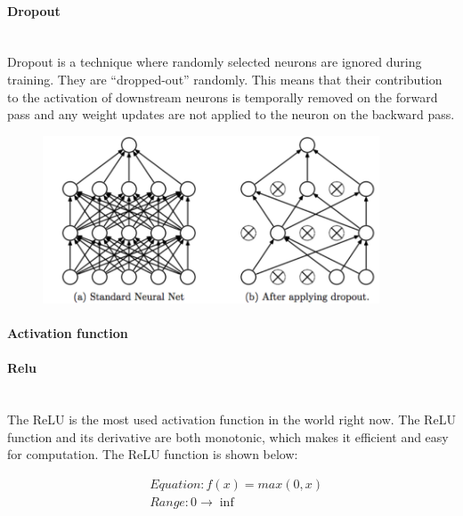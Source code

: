 \documentclass[runningheads]{llncs}
\begin{document}
\paragraph{\large\bf Dropout}\hspace*{\fill} \\
Dropout is a technique where randomly selected neurons are ignored during training. They are “dropped-out” randomly. This means that their contribution to the activation of downstream neurons is temporally removed on the forward pass and any weight updates are not applied to the neuron on the backward pass.\cite{cnn_project}

\begin{figure}[H]
    \centering
    \includegraphics[width=10cm]{Figures/dropout.png}
    \label{fig:dropout}
\end{figure}

\paragraph{\large\bf Activation function}\hspace*{\fill}
\paragraph{\bf Relu}\hspace*{\fill} \\
The ReLU is the most used activation function in the world right now. The ReLU function and its derivative are both monotonic, which makes it efficient and easy for computation. The ReLU function is shown below:

\begin{equation}
\begin{aligned}
    &Equation: f(x) = max(0, x) \\
    &Range: 0 \rightarrow \inf
\end{aligned}
\end{equation}
\end{document}
